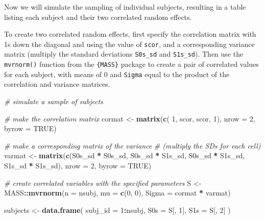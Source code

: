 \documentclass[doc,floatsintext]{apa6}
\newenvironment{Shaded}{\begin{snugshade}}{\end{snugshade}}
\newcommand{\KeywordTok}[1]{\textcolor[rgb]{0.13,0.29,0.53}{\textbf{#1}}}
\newcommand{\DataTypeTok}[1]{\textcolor[rgb]{0.13,0.29,0.53}{#1}}
\newcommand{\DecValTok}[1]{\textcolor[rgb]{0.00,0.00,0.81}{#1}}
\newcommand{\StringTok}[1]{\textcolor[rgb]{0.31,0.60,0.02}{#1}}
\newcommand{\CommentTok}[1]{\textcolor[rgb]{0.56,0.35,0.01}{\textit{#1}}}
\newcommand{\OtherTok}[1]{\textcolor[rgb]{0.56,0.35,0.01}{#1}}
\newcommand{\OperatorTok}[1]{\textcolor[rgb]{0.81,0.36,0.00}{\textbf{#1}}}
\newcommand{\NormalTok}[1]{#1}
\begin{document}
Now we will simulate the sampling of individual subjects, resulting in a
table listing each subject and their two correlated random effects.

To create two correlated random effects, first specify the correlation
matrix with 1s down the diagonal and using the value of \texttt{scor},
and a corresponding variance matrix (multiply the standard deviations
\texttt{S0s\_sd} and \texttt{S1s\_sd}). Then use the \texttt{mvrnorm()}
function from the \texttt{\{MASS\}} package to create a pair of
correlated values for each subject, with means of 0 and \texttt{Sigma}
equal to the product of the correlation and variance matrices.

\begin{Shaded}
\begin{Highlighting}[]
\CommentTok{# simulate a sample of subjects}

\CommentTok{# make the correlation matrix}
\NormalTok{cormat <-}\StringTok{ }\KeywordTok{matrix}\NormalTok{(}\KeywordTok{c}\NormalTok{(   }\DecValTok{1}\NormalTok{, scor,}
\NormalTok{                   scor,    }\DecValTok{1}\NormalTok{), }
             \DataTypeTok{nrow =} \DecValTok{2}\NormalTok{, }\DataTypeTok{byrow =} \OtherTok{TRUE}\NormalTok{) }

\CommentTok{# make a corresponding matrix of the variance }
\CommentTok{# (multiply the SDs for each cell)}
\NormalTok{varmat <-}\StringTok{ }\KeywordTok{matrix}\NormalTok{(}\KeywordTok{c}\NormalTok{(S0s_sd }\OperatorTok{*}\StringTok{ }\NormalTok{S0s_sd, S0s_sd }\OperatorTok{*}\StringTok{ }\NormalTok{S1s_sd,}
\NormalTok{                  S0s_sd }\OperatorTok{*}\StringTok{ }\NormalTok{S1s_sd, S1s_sd }\OperatorTok{*}\StringTok{ }\NormalTok{S1s_sd), }
             \DataTypeTok{nrow =} \DecValTok{2}\NormalTok{, }\DataTypeTok{byrow =} \OtherTok{TRUE}\NormalTok{) }

\CommentTok{# create correlated variables with the specified parameters}
\NormalTok{S <-}\StringTok{ }\NormalTok{MASS}\OperatorTok{::}\KeywordTok{mvrnorm}\NormalTok{(}\DataTypeTok{n =}\NormalTok{ nsubj, }\DataTypeTok{mu =} \KeywordTok{c}\NormalTok{(}\DecValTok{0}\NormalTok{, }\DecValTok{0}\NormalTok{), }\DataTypeTok{Sigma =}\NormalTok{ cormat }\OperatorTok{*}\StringTok{ }\NormalTok{varmat)}

\NormalTok{subjects <-}\StringTok{ }\KeywordTok{data.frame}\NormalTok{(}
  \DataTypeTok{subj_id =} \DecValTok{1}\OperatorTok{:}\NormalTok{nsubj,}
  \DataTypeTok{S0s =}\NormalTok{ S[, }\DecValTok{1}\NormalTok{],}
  \DataTypeTok{S1s =}\NormalTok{ S[, }\DecValTok{2}\NormalTok{]}
\NormalTok{)}
\end{Highlighting}
\end{Shaded}
\end{document}
